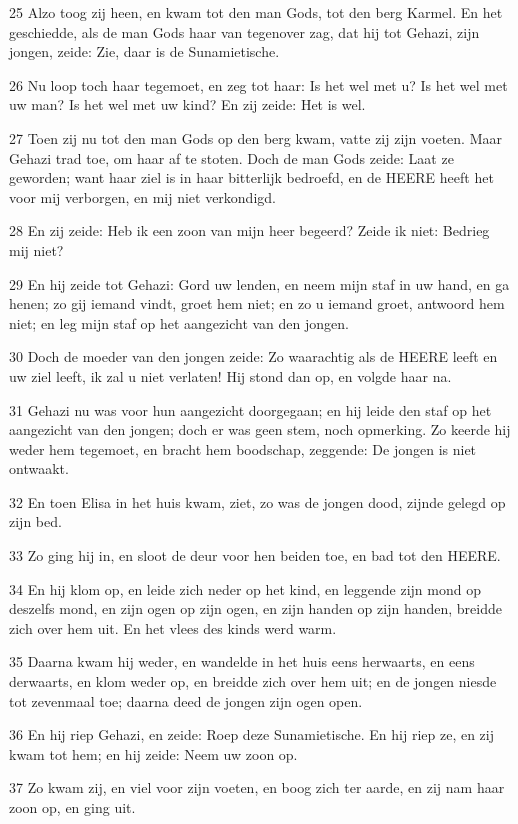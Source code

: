 \par 25 Alzo toog zij heen, en kwam tot den man Gods, tot den berg Karmel. En het geschiedde, als de man Gods haar van tegenover zag, dat hij tot Gehazi, zijn jongen, zeide: Zie, daar is de Sunamietische.
\par 26 Nu loop toch haar tegemoet, en zeg tot haar: Is het wel met u? Is het wel met uw man? Is het wel met uw kind? En zij zeide: Het is wel.
\par 27 Toen zij nu tot den man Gods op den berg kwam, vatte zij zijn voeten. Maar Gehazi trad toe, om haar af te stoten. Doch de man Gods zeide: Laat ze geworden; want haar ziel is in haar bitterlijk bedroefd, en de HEERE heeft het voor mij verborgen, en mij niet verkondigd.
\par 28 En zij zeide: Heb ik een zoon van mijn heer begeerd? Zeide ik niet: Bedrieg mij niet?
\par 29 En hij zeide tot Gehazi: Gord uw lenden, en neem mijn staf in uw hand, en ga henen; zo gij iemand vindt, groet hem niet; en zo u iemand groet, antwoord hem niet; en leg mijn staf op het aangezicht van den jongen.
\par 30 Doch de moeder van den jongen zeide: Zo waarachtig als de HEERE leeft en uw ziel leeft, ik zal u niet verlaten! Hij stond dan op, en volgde haar na.
\par 31 Gehazi nu was voor hun aangezicht doorgegaan; en hij leide den staf op het aangezicht van den jongen; doch er was geen stem, noch opmerking. Zo keerde hij weder hem tegemoet, en bracht hem boodschap, zeggende: De jongen is niet ontwaakt.
\par 32 En toen Elisa in het huis kwam, ziet, zo was de jongen dood, zijnde gelegd op zijn bed.
\par 33 Zo ging hij in, en sloot de deur voor hen beiden toe, en bad tot den HEERE.
\par 34 En hij klom op, en leide zich neder op het kind, en leggende zijn mond op deszelfs mond, en zijn ogen op zijn ogen, en zijn handen op zijn handen, breidde zich over hem uit. En het vlees des kinds werd warm.
\par 35 Daarna kwam hij weder, en wandelde in het huis eens herwaarts, en eens derwaarts, en klom weder op, en breidde zich over hem uit; en de jongen niesde tot zevenmaal toe; daarna deed de jongen zijn ogen open.
\par 36 En hij riep Gehazi, en zeide: Roep deze Sunamietische. En hij riep ze, en zij kwam tot hem; en hij zeide: Neem uw zoon op.
\par 37 Zo kwam zij, en viel voor zijn voeten, en boog zich ter aarde, en zij nam haar zoon op, en ging uit.
